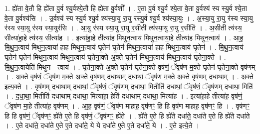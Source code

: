 \documentclass[17pt]{extarticle}
\begin{document}
1. ह्ये॑ता वे॒तौ हि ह्ये॑ता वु॒र्व श्यु॒र्वश्ये॒तौ हि ह्ये॑ता वु॒र्वशी᳚ । . ए॒ता वु॒र्व श्यु॒र्व श्ये॒ता वे॒ता वु॒र्वश्य॑ स्य स्यु॒र्व श्ये॒ता वे॒ता वु॒र्वश्य॑सि । . उ॒र्वश्य॑ स्य स्यु॒र्व श्यु॒र्व श्य॑स्या॒यु रा॒यु र॑स्यु॒र्व श्यु॒र्व श्य॑स्या॒युः । . अ॒स्या॒यु रा॒यु र॑स्य स्या॒यु र॑स्य स्या॒यु र॑स्य स्या॒युर॑सि । . आ॒यु र॑स्य स्या॒यु रा॒यु र॒सीती त्य॑स्या॒यु रा॒यु र॒सीति॑ । . अ॒सीती त्य॑स्य॒ सीत्या॑हा॒हे त्य॑स्य॒ सीत्या॑ह । . इत्या॑हा॒हे तीत्या॑ह मिथुन॒त्वाय॑ मिथुन॒त्वाया॒हे तीत्या॑ह मिथुन॒त्वाय॑ । . आ॒ह॒ मि॒थु॒न॒त्वाय॑ मिथुन॒त्वाया॑ हाह मिथुन॒त्वाय॑ घृ॒तेन॑ घृ॒तेन॑ मिथुन॒त्वाया॑ हाह मिथुन॒त्वाय॑ घृ॒तेन॑ । . मि॒थु॒न॒त्वाय॑ घृ॒तेन॑ घृ॒तेन॑ मिथुन॒त्वाय॑ मिथुन॒त्वाय॑ घृ॒तेना॒क्ते अ॒क्ते घृ॒तेन॑ मिथुन॒त्वाय॑ मिथुन॒त्वाय॑ घृ॒तेना॒क्ते । . मि॒थु॒न॒त्वायेति॑ मिथुन - त्वाय॑ । . घृ॒तेना॒क्ते अ॒क्ते घृ॒तेन॑ घृ॒तेना॒क्ते वृष॑णं॒ ॅवृष॑ण म॒क्ते घृ॒तेन॑ घृ॒तेना॒क्ते वृष॑णम् । . अ॒क्ते वृष॑णं॒ ॅवृष॑ण म॒क्ते अ॒क्ते वृष॑णम् दधाथाम् दधाथां॒ ॅवृष॑ण म॒क्ते अ॒क्ते वृष॑णम् दधाथाम् । . अ॒क्ते इत्य॒क्ते । . वृष॑णम् दधाथाम् दधाथां॒ ॅवृष॑णं॒ ॅवृष॑णम् दधाथा॒ मितीति॑ दधाथां॒ ॅवृष॑णं॒ ॅवृष॑णम् दधाथा॒ मिति॑ । . द॒धा॒था॒ मितीति॑ दधाथाम् दधाथा॒ मित्या॑हा॒ हेति॑ दधाथाम् दधाथा॒ मित्या॑ह । . इत्या॑हा॒हे तीत्या॑ह॒ वृष॑णं॒ ॅवृष॑ण मा॒हे तीत्या॑ह॒ वृष॑णम् । . आ॒ह॒ वृष॑णं॒ ॅवृष॑ण माहाह॒ वृष॑णꣳ॒॒ हि हि वृष॑ण माहाह॒ वृष॑णꣳ॒॒ हि । . वृष॑णꣳ॒॒ हि हि वृष॑णं॒ ॅवृष॑णꣳ॒॒ ह्ये॑ते ए॒ते हि वृष॑णं॒ ॅवृष॑णꣳ॒॒ ह्ये॑ते । . ह्ये॑ते ए॒ते हि ह्ये॑ते दधा॑ते॒ दधा॑ते ए॒ते हि ह्ये॑ते दधा॑ते । . ए॒ते दधा॑ते॒ दधा॑ते ए॒ते ए॒ते दधा॑ते॒ ये ये दधा॑ते ए॒ते ए॒ते दधा॑ते॒ ये । . ए॒ते इत्ये॒ते । \newline
\end{document}
